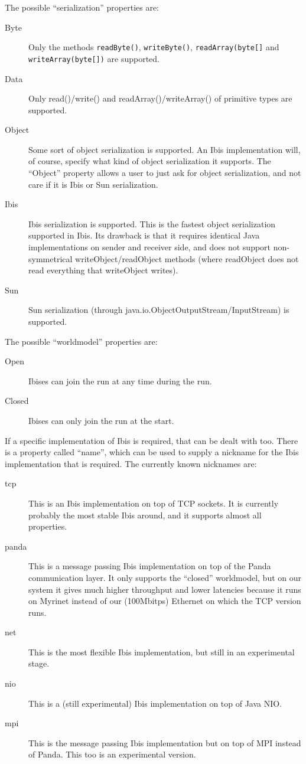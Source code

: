 \documentclass[10pt]{article}
\begin{document}
The possible ``serialization'' properties are:
\begin{description}
\item[Byte]
Only the methods \texttt{readByte()}, \texttt{writeByte()}, \verb'readArray(byte[]' and \verb'writeArray(byte[])' are supported.
\item[Data]
Only read()/write() and readArray()/writeArray() of primitive types are supported.
\item[Object]
Some sort of object serialization is supported. An Ibis implementation
will, of course, specify what kind of object serialization it supports.
The ``Object'' property allows a user to just ask for object
serialization, and not care if it is Ibis or Sun serialization.
\item[Ibis]
Ibis serialization is supported.
This is the fastest object serialization supported in Ibis. Its drawback
is that it requires identical Java implementations on sender and
receiver side, and does not support
non-symmetrical writeObject/readObject methods (where readObject does not
read everything that writeObject writes).
\item[Sun]
Sun serialization (through java.io.ObjectOutputStream/InputStream) is
supported.
\end{description}

The possible ``worldmodel'' properties are:
\begin{description}
\item[Open]
Ibises can join the run at any time during the run.
\item[Closed]
Ibises can only join the run at the start.
\end{description}

If a specific implementation of Ibis is required, that can be dealt with too.
There is a property called ``name'', which can be used to supply a nickname
for the Ibis implementation that is required.
The currently known nicknames are:
\begin{description}
\item[tcp]
This is an Ibis implementation on top of TCP sockets. It is currently 
probably the most stable Ibis around, and it supports almost all properties.
\item[panda]
This is a message passing Ibis implementation on top of the Panda
communication layer. It only supports the ``closed'' worldmodel,
but on our system it gives much higher throughput and lower latencies
because it runs on Myrinet instead of our (100Mbitps) Ethernet on which
the TCP version runs.
\item[net]
This is the most flexible Ibis implementation, but still in an experimental
stage.
\item[nio]
This is a (still experimental) Ibis implementation on top of Java NIO.
\item[mpi]
This is the message passing Ibis implementation but on top of MPI instead
of Panda. This too is an experimental version.
\end{description}
\end{document}
